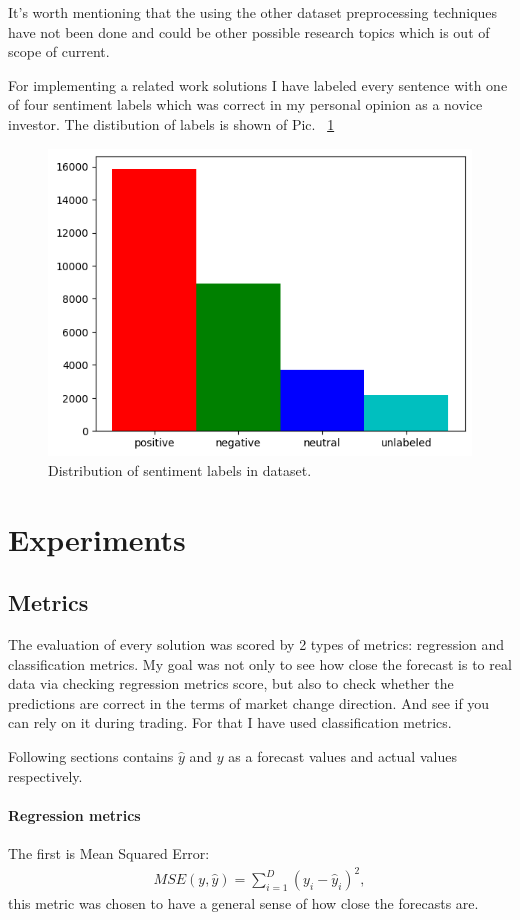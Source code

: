 \documentclass{article}
\begin{document}
It's worth mentioning that the using the other dataset preprocessing techniques have not been done and could be other possible research topics which is out of scope of current.

For implementing a related work solutions I have labeled every sentence with one of four sentiment labels which was correct in my personal opinion as a novice investor. The distibution of labels is shown of Pic. ~\ref{fig:labels}

\begin{figure}[!tbh]
    \centering
    \includegraphics[width=0.5\linewidth]{labels.png}
    \caption{Distribution of sentiment labels in dataset.}
    \label{fig:labels}
\end{figure}



\section{Experiments}
\label{sec:experiments}
\subsection{Metrics}
The evaluation of every solution was scored by 2 types of metrics: regression and classification metrics.
My goal was not only to see how close the forecast is to real data via checking regression metrics score, but also to check whether the predictions are correct in the terms of market change direction. And see if you can rely on it during trading.
For that I have used classification metrics.

Following sections contains $\hat{y}$ and $y$ as a forecast values and actual values respectively.

\paragraph{Regression metrics}

The first is Mean Squared Error:
\begin{align}
MSE(y, \hat{y})=\sum_{i=1}^{D}(y_i-\hat{y}_i)^2,
\end{align}
this metric was chosen to have a general sense of how close the forecasts are.
\end{document}
